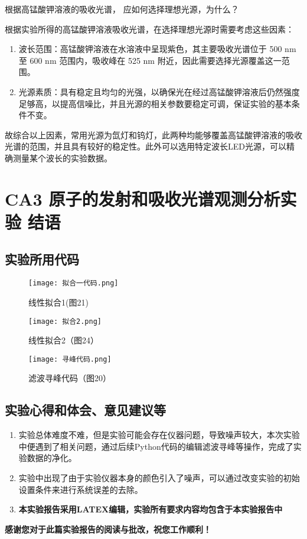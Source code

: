\documentclass[dvipsnames, svgnames,a4paper,11pt]{article}
\begin{document}
	
	\begin{question}
		根据高锰酸钾溶液的吸收光谱， 应如何选择理想光源，为什么？
	\end{question}
	根据实验所得的高锰酸钾溶液吸收光谱，在选择理想光源时需要考虑这些因素：
	\begin{enumerate}
		\item 波长范围：高锰酸钾溶液在水溶液中呈现紫色，其主要吸收光谱位于 500 nm 至 600 nm 范围内，吸收峰在 525 nm 附近，因此需要选择光源覆盖这一范围。
		\item 光源素质：具有稳定且均匀的光强，以确保光在经过高锰酸钾溶液后仍然强度足够高，以提高信噪比，并且光源的相关参数要稳定可调，保证实验的基本条件不变。
	\end{enumerate}
	故综合以上因素，常用光源为氙灯和钨灯，此两种均能够覆盖高锰酸钾溶液的吸收光谱的范围，并且具有较好的稳定性。此外可以选用特定波长LED光源，可以精确测量某个波长的实验数据。
	
	
	\clearpage
	
	\section{CA3 \quad 原子的发射和吸收光谱观测分析实验 \quad\heiti 结语}
	\subsection{实验所用代码}
\begin{figure}[H]
	\begin{minipage}[b]{0.3\linewidth}
	  \centering
	  \texttt{[image: 拟合一代码.png]}
	  \caption{线性拟合1(图21)}
	\end{minipage}
	\hfill
	\begin{minipage}[b]{0.3\linewidth}
	  \centering
	  \texttt{[image: 拟合2.png]}
	  \caption{线性拟合2（图24）}
	\end{minipage}
	\hfill
	\begin{minipage}[b]{0.3\linewidth}
	  \centering
	  \texttt{[image: 寻峰代码.png]}
	  \caption{滤波寻峰代码（图20）}
	\end{minipage}
\end{figure}
	\subsection{实验心得和体会、意见建议等}
	\begin{enumerate}
		\item 实验总体难度不难，但是实验可能会存在仪器问题，导致噪声较大，本次实验中便遇到了相关问题，通过后续Python代码的编辑滤波寻峰等操作，完成了实验数据的净化。
		\item 实验中出现了由于实验仪器本身的颜色引入了噪声，可以通过改变实验的初始设置条件来进行系统误差的去除。
		\item \textbf{本实验报告采用LATEX编辑，实验所有要求内容均包含于本实验报告中}
	\end{enumerate}
	\quad \large \textbf{感谢您对于此篇实验报告的阅读与批改，祝您工作顺利！}
	
\end{document}
